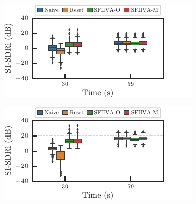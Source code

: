 \documentclass[sip,biber]{now-journal}
\begin{document}
\begin{figure}[t]
  \centering
  \begin{minipage}[t]{.45\textwidth}
    \centering\includegraphics{figures/plots/online/box_900.pdf}\label{fig:plot:box:900}
  \end{minipage}
  \begin{minipage}[t]{.45\textwidth}
    \centering\includegraphics{figures/plots/online/box_950.pdf}\label{fig:plot:box:950}
  \end{minipage}


\end{figure}
\end{document}
